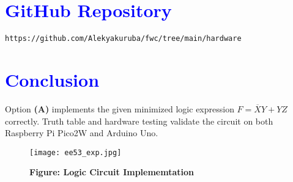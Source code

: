 \documentclass[twocolumn]{article}
\begin{document}
\section*{\textcolor{blue}{GitHub Repository}}
\texttt{https://github.com/Alekyakuruba/fwc/tree/main/hardware}
\vspace{1em}
\section*{\textcolor{blue}{Conclusion}}
Option \textbf{(A)} implements the given minimized logic expression \( F = \overline{X}Y + YZ \) correctly. Truth table and hardware testing validate the circuit on both Raspberry Pi Pico2W and Arduino Uno.
\vspace{2em}\begin{figure}[H]
    \centering
    \texttt{[image: ee53\_exp.jpg]}
    \caption*{\textbf{Figure: Logic Circuit Implememtation}}
\end{figure}
\end{document}
